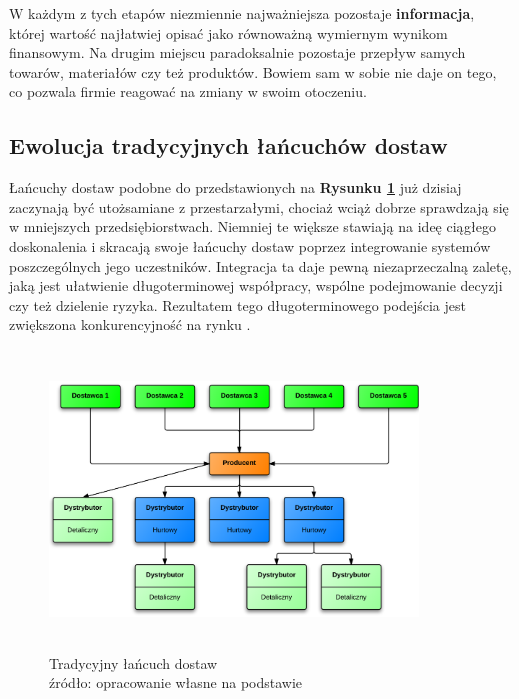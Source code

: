 	W każdym z tych etapów niezmiennie najważniejsza 
	pozostaje \textbf{informacja}, której wartość najłatwiej
	opisać jako równoważną wymiernym wynikom finansowym. 
	Na drugim miejscu paradoksalnie pozostaje przepływ
	samych towarów, materiałów czy też produktów. 
	Bowiem sam w sobie nie daje on tego, co pozwala
	firmie reagować na zmiany w swoim otoczeniu.
	
	\subsection{Ewolucja tradycyjnych łańcuchów dostaw}
		\hspace{15pt}Łańcuchy dostaw podobne do przedstawionych na \textbf{Rysunku \ref{fig:simple_supply_chain}} już dzisiaj 
		zaczynają być utożsamiane z przestarzałymi, chociaż
		wciąż dobrze sprawdzają się w mniejszych przedsiębiorstwach. 
		Niemniej te większe stawiają na ideę ciągłego doskonalenia
		i skracają swoje łańcuchy dostaw poprzez integrowanie 
		systemów poszczególnych jego uczestników.
		Integracja ta daje pewną niezaprzeczalną zaletę, jaką jest ułatwienie 
		długoterminowej współpracy, wspólne podejmowanie decyzji czy też
		dzielenie ryzyka. Rezultatem tego długoterminowego
		podejścia jest zwiększona konkurencyjność na rynku \cite{zarzadzanie_lancuchem_dostaw_w_dobie_gospodarki_elektroniczej}.\\
		
		\begin{figure}[h]
			\centering
			\includegraphics[width=370px, height=300px]{images/BasicSupplyChain}
			\caption[Schemat budowy prostego łańcucha dostaw]{
				Tradycyjny łańcuch dostaw \\
				źródło: opracowanie własne na podstawie \cite{zarzadzanie_lancuchem_dostaw_w_dobie_gospodarki_elektroniczej}
			}
			\label{fig:simple_supply_chain}
		\end{figure}		
		
